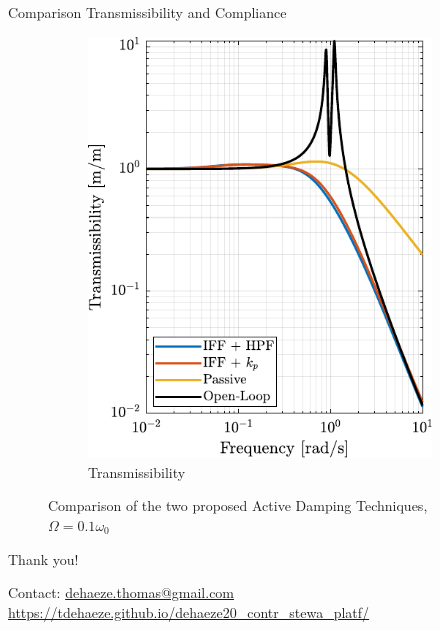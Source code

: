 \documentclass[t, minted]{clean-beamer}
\begin{document}
\begin{frame}[label={sec:org9effb95}]{Comparison Transmissibility and Compliance}
\begin{figure}[htbp]
\begin{subfigure}[c]{0.49\linewidth}
\includegraphics[width=\linewidth]{figs/comp_transmissibility.pdf}
\caption{\label{fig:comp_transmissibility} Transmissibility}
\end{subfigure}
\hfill
\caption{Comparison of the two proposed Active Damping Techniques, \(\Omega = 0.1 \omega_0\)}
\centering
\end{figure}
\end{frame}

\begin{frame}[label={sec:org46c3efd}]{}
\vspace{8em}
\begin{center}
\Huge Thank you!
\end{center}
\vspace{8em}

Contact: \href{mailto:dehaeze.thomas@gmail.com}{dehaeze.thomas@gmail.com}
\vspace{1em}
\small \url{https://tdehaeze.github.io/dehaeze20\_contr\_stewa\_platf/}
\end{frame}
\end{document}
